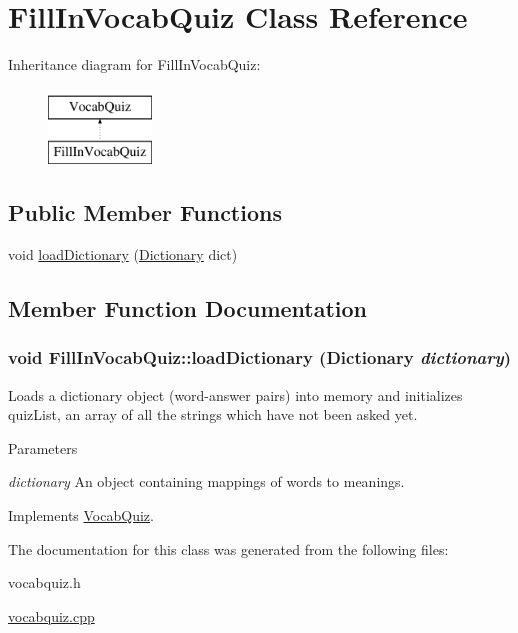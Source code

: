 \hypertarget{classFillInVocabQuiz}{
\section{FillInVocabQuiz Class Reference}
\label{classFillInVocabQuiz}
}
Inheritance diagram for FillInVocabQuiz:\begin{figure}[H]
\begin{center}
\leavevmode
\includegraphics[height=2cm]{classFillInVocabQuiz}
\end{center}
\end{figure}
\subsection*{Public Member Functions}
\begin{DoxyCompactItemize}
\item 
void \hyperlink{classFillInVocabQuiz_affe1c2da58f58e96643a5d95bf3a6e47}{loadDictionary} (\hyperlink{classDictionary}{Dictionary} dict)
\end{DoxyCompactItemize}


\subsection{Member Function Documentation}
\hypertarget{classFillInVocabQuiz_affe1c2da58f58e96643a5d95bf3a6e47}{
\subsubsection[{loadDictionary}]{\setlength{\rightskip}{0pt plus 5cm}void FillInVocabQuiz::loadDictionary ({\bf Dictionary} {\em dictionary})}}
\label{classFillInVocabQuiz_affe1c2da58f58e96643a5d95bf3a6e47}
Loads a dictionary object (word-\/answer pairs) into memory and initializes quizList, an array of all the strings which have not been asked yet. 
\begin{DoxyParams}{Parameters}
\item[{\em dictionary}]An object containing mappings of words to meanings. \end{DoxyParams}


Implements \hyperlink{classVocabQuiz}{VocabQuiz}.



The documentation for this class was generated from the following files:\begin{DoxyCompactItemize}
\item 
vocabquiz.h\item 
\hyperlink{vocabquiz_8cpp}{vocabquiz.cpp}\end{DoxyCompactItemize}
